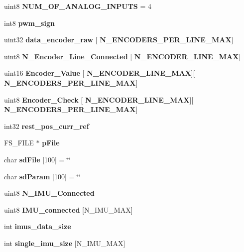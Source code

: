\begin{DoxyCompactItemize}
\item 
uint8 \textbf{ N\+U\+M\+\_\+\+O\+F\+\_\+\+A\+N\+A\+L\+O\+G\+\_\+\+I\+N\+P\+U\+TS} = 4
\item 
int8 \textbf{ pwm\+\_\+sign}
\item 
\mbox{\label{globals_8c_a5190337b2d433e192edc68cf3d603ede}} 
uint32 {\bfseries data\+\_\+encoder\+\_\+raw} [\textbf{ N\+\_\+\+E\+N\+C\+O\+D\+E\+R\+S\+\_\+\+P\+E\+R\+\_\+\+L\+I\+N\+E\+\_\+\+M\+AX}]
\item 
\mbox{\label{globals_8c_ae62a59fe712aba1b45a5358ece0b3d35}} 
uint8 {\bfseries N\+\_\+\+Encoder\+\_\+\+Line\+\_\+\+Connected} [\textbf{ N\+\_\+\+E\+N\+C\+O\+D\+E\+R\+\_\+\+L\+I\+N\+E\+\_\+\+M\+AX}]
\item 
\mbox{\label{globals_8c_a7bf300fb19b8dd8db6783ef124605540}} 
uint16 {\bfseries Encoder\+\_\+\+Value} [\textbf{ N\+\_\+\+E\+N\+C\+O\+D\+E\+R\+\_\+\+L\+I\+N\+E\+\_\+\+M\+AX}][\textbf{ N\+\_\+\+E\+N\+C\+O\+D\+E\+R\+S\+\_\+\+P\+E\+R\+\_\+\+L\+I\+N\+E\+\_\+\+M\+AX}]
\item 
\mbox{\label{globals_8c_a269cff8427d6a8902a38dc258d649f06}} 
uint8 {\bfseries Encoder\+\_\+\+Check} [\textbf{ N\+\_\+\+E\+N\+C\+O\+D\+E\+R\+\_\+\+L\+I\+N\+E\+\_\+\+M\+AX}][\textbf{ N\+\_\+\+E\+N\+C\+O\+D\+E\+R\+S\+\_\+\+P\+E\+R\+\_\+\+L\+I\+N\+E\+\_\+\+M\+AX}]
\item 
int32 \textbf{ rest\+\_\+pos\+\_\+curr\+\_\+ref}
\item 
\mbox{\label{globals_8c_a28568209e5c79332f574608aafcd14ec}} 
F\+S\+\_\+\+F\+I\+LE $\ast$ {\bfseries p\+File}
\item 
\mbox{\label{globals_8c_a93ea3c816e507e10c5a48cb79d624863}} 
char {\bfseries sd\+File} [100] = \char`\"{}\char`\"{}
\item 
\mbox{\label{globals_8c_ad49779e5c549cf4cb332a929eacc6b71}} 
char {\bfseries sd\+Param} [100] = \char`\"{}\char`\"{}
\item 
\mbox{\label{globals_8c_a47118db87acd24ae6dac18b036f360ec}} 
uint8 {\bfseries N\+\_\+\+I\+M\+U\+\_\+\+Connected}
\item 
\mbox{\label{globals_8c_a99668f3210aba0be3baec19486621bce}} 
uint8 {\bfseries I\+M\+U\+\_\+connected} [N\+\_\+\+I\+M\+U\+\_\+\+M\+AX]
\item 
\mbox{\label{globals_8c_a86272fcfcab512d38a11824196df4bbc}} 
int {\bfseries imus\+\_\+data\+\_\+size}
\item 
\mbox{\label{globals_8c_aca96c483c3e269e3805aa861ced0aef5}} 
int {\bfseries single\+\_\+imu\+\_\+size} [N\+\_\+\+I\+M\+U\+\_\+\+M\+AX]
\item 

\end{DoxyCompactItemize}
